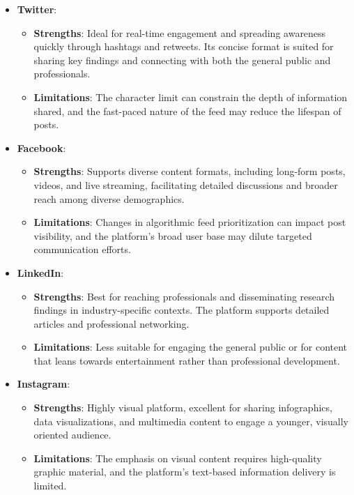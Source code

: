 \documentclass[
]{book}
\providecommand{\tightlist}{%
  \setlength{\itemsep}{0pt}\setlength{\parskip}{0pt}}
\begin{document}
\begin{itemize}
\tightlist
\item
  \textbf{Twitter}:

  \begin{itemize}
  \tightlist
  \item
    \textbf{Strengths}: Ideal for real-time engagement and spreading awareness quickly through hashtags and retweets. Its concise format is suited for sharing key findings and connecting with both the general public and professionals.
  \item
    \textbf{Limitations}: The character limit can constrain the depth of information shared, and the fast-paced nature of the feed may reduce the lifespan of posts.
  \end{itemize}
\item
  \textbf{Facebook}:

  \begin{itemize}
  \tightlist
  \item
    \textbf{Strengths}: Supports diverse content formats, including long-form posts, videos, and live streaming, facilitating detailed discussions and broader reach among diverse demographics.
  \item
    \textbf{Limitations}: Changes in algorithmic feed prioritization can impact post visibility, and the platform's broad user base may dilute targeted communication efforts.
  \end{itemize}
\item
  \textbf{LinkedIn}:

  \begin{itemize}
  \tightlist
  \item
    \textbf{Strengths}: Best for reaching professionals and disseminating research findings in industry-specific contexts. The platform supports detailed articles and professional networking.
  \item
    \textbf{Limitations}: Less suitable for engaging the general public or for content that leans towards entertainment rather than professional development.
  \end{itemize}
\item
  \textbf{Instagram}:

  \begin{itemize}
  \tightlist
  \item
    \textbf{Strengths}: Highly visual platform, excellent for sharing infographics, data visualizations, and multimedia content to engage a younger, visually oriented audience.
  \item
    \textbf{Limitations}: The emphasis on visual content requires high-quality graphic material, and the platform's text-based information delivery is limited.
  \end{itemize}
\end{itemize}
\end{document}
